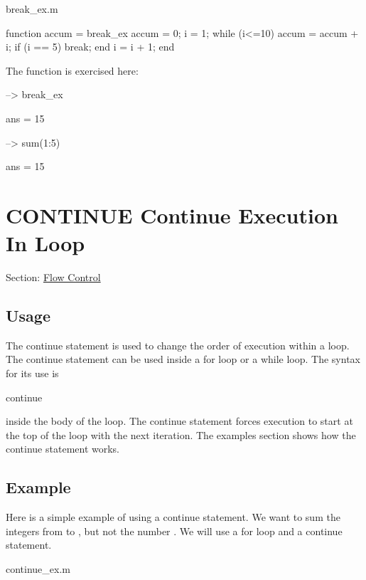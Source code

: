 \begin{DoxyVerb}     break_ex.m
\end{DoxyVerb}



\begin{DoxyVerbInclude}
function accum = break_ex
  accum = 0;
  i = 1;
  while (i<=10)
    accum = accum + i;
    if (i == 5)
      break;
    end
    i = i + 1;
  end
\end{DoxyVerbInclude}


The function is exercised here\-:


\begin{DoxyVerbInclude}
--> break_ex

ans = 
 15 

--> sum(1:5)

ans = 
 15 
\end{DoxyVerbInclude}
 \hypertarget{flow_continue}{}\section{C\-O\-N\-T\-I\-N\-U\-E Continue Execution In Loop}\label{flow_continue}
Section\-: \hyperlink{sec_flow}{Flow Control} \hypertarget{vtkwidgets_vtkxyplotwidget_Usage}{}\subsection{Usage}\label{vtkwidgets_vtkxyplotwidget_Usage}
The {\ttfamily continue} statement is used to change the order of execution within a loop. The {\ttfamily continue} statement can be used inside a {\ttfamily for} loop or a {\ttfamily while} loop. The syntax for its use is \begin{DoxyVerb}   continue
\end{DoxyVerb}
 inside the body of the loop. The {\ttfamily continue} statement forces execution to start at the top of the loop with the next iteration. The examples section shows how the {\ttfamily continue} statement works. \hypertarget{variables_struct_Example}{}\subsection{Example}\label{variables_struct_Example}
Here is a simple example of using a {\ttfamily continue} statement. We want to sum the integers from {} to {}, but not the number {}. We will use a {\ttfamily for} loop and a continue statement.

\begin{DoxyVerb}     continue_ex.m
\end{DoxyVerb}



